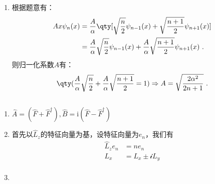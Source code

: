 
\begin{issues}
\issueDraft
\end{issues}

\subsection{ }
\begin{enumerate}
\item 根据题意有：
\begin{equation}
\begin{aligned}
Ax\psi_n(x)&=\frac{A}{\alpha}\qty[\sqrt{\frac{n}{2}}\psi_{n-1}(x)+\sqrt{\frac{n+1}{2}}\psi_{n+1}(x)] \\
&=\frac{A}{\alpha}\sqrt{\frac{n}{2}}\psi_{n-1}(x)+\frac{A}{\alpha}\sqrt{\frac{n+1}{2}}\psi_{n+1}(x)~.
\end{aligned}
\end{equation}
则归一化系数$A$有：
\begin{equation}
\qty(\frac{A}{\alpha}\sqrt{\frac{n}{2}}+\frac{A}{\alpha}\sqrt{\frac{n+1}{2}}=1)\Rightarrow A=\sqrt{\frac{2\alpha^2}{2n+1}}~.
\end{equation}
\end{enumerate}
\subsection{ }
\begin{enumerate}
\item $\hat A=(\hat F+\hat F^\dagger),\hat B=\mathrm i(\hat F-\hat F^\dagger)$
\item 首先以$\hat L_z$的特征向量为基，设特征向量为$e_n$，我们有
\begin{equation}
\begin{aligned}
\hat L_z e_n&=ne_n\\
L_x&=L_x\pm\mathcal i L_y\\
\end{aligned}
\end{equation}

\item 
\end{enumerate}
\subsection{ }
\subsection{ }
\subsection{ }
